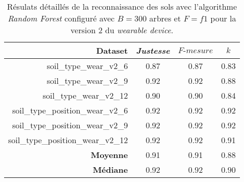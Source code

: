\begin{table}[H]\renewcommand{\arraystretch}{0.5}
	\centering
	\caption{Résulats détaillés de la reconnaissance des sols avec l'algorithme \textit{Random Forest} configuré avec $B=300$ arbres et $F=f1$ pour la version 2 du \textit{wearable device}.}
	\label{tab:tab:rf-300-f1-wear-v2}
	\begin{tabular}{@{}rccc@{}}
		\toprule
			\textbf{Dataset} & \textit{Justesse} & $F\mbox{-} mesure$ & \textbf{$k$} \\
		\midrule
			soil\_type\_wear\_v2\_6 & 0.87 & 0.87 & 0.83 \\
			soil\_type\_wear\_v2\_9 & 0.92 & 0.92 & 0.88 \\
			soil\_type\_wear\_v2\_12 & 0.90 & 0.90 & 0.84 \\
			soil\_type\_position\_wear\_v2\_6 & 0.92 & 0.92 & 0.92 \\
			soil\_type\_position\_wear\_v2\_9 & 0.92 & 0.92 & 0.92 \\
			soil\_type\_position\_wear\_v2\_12 & 0.92 & 0.92 & 0.91 \\
			\textbf{Moyenne} & 0.91 & 0.91 & 0.88 \\
			\textbf{Médiane} & 0.92 & 0.92 & 0.90 \\
		\bottomrule
	\end{tabular}
\end{table}


